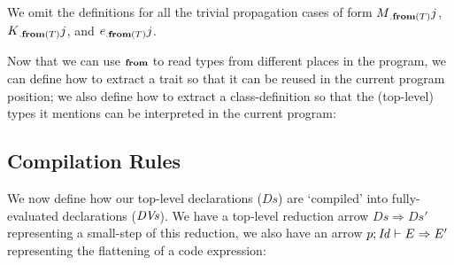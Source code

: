 We omit the definitions for all the trivial propagation cases of form $M{{}_{.\textbf{from}({T})}}{j}$, $K{{}_{.\textbf{from}({T})}}{j}$, and $e{{}_{.\textbf{from}({T})}}{j}$.

\begin{defs}
	
	
\end{defs}

Now that we can use $\scriptsize\textbf{from}$ to read types from different places in the program, we can define how to extract a trait so that it can be reused in the current program position; we also define how to extract a class-definition so that the (top-level) types it mentions can be interpreted in the current program:

\begin{defs}
\end{defs}

\subsection{Compilation Rules}
We now define how our top-level declarations ($Ds$) are `compiled' into fully-evaluated declarations ($\textit{DVs}$). We have a top-level reduction arrow $Ds \Rightarrow Ds'$ representing a small-step of this reduction, we also have an arrow $p; \mathit{Id}\vdash E\Rightarrow E'$ representing the flattening of a code expression:

